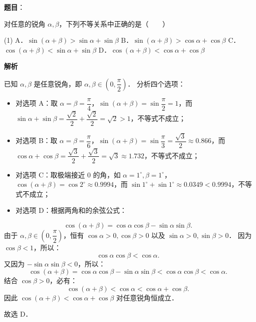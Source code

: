 \begin{answer}

\textbf{题目}：

对任意的锐角 $\alpha, \beta$，下列不等关系中正确的是\mbox{（　　）}

\begin{gkopts}(1)
\task A．$\sin(\alpha + \beta) > \sin\alpha + \sin\beta$
\task B．$\sin(\alpha + \beta) > \cos\alpha + \cos\beta$
\task C．$\cos(\alpha + \beta) < \sin\alpha + \sin\beta$
\task D．$\cos(\alpha + \beta) < \cos\alpha + \cos\beta$
\end{gkopts}

\textbf{解析}

已知 $\alpha, \beta$ 是任意锐角，即 $\alpha, \beta \in \left(0, \dfrac{\pi}{2}\right)$．
分析四个选项：
\begin{itemize}
\item 对选项 A：取 $\alpha = \beta = \dfrac{\pi}{4}$，$\sin(\alpha + \beta) = \sin\dfrac{\pi}{2} = 1$，而 $\sin\alpha + \sin\beta = \dfrac{\sqrt{2}}{2} + \dfrac{\sqrt{2}}{2} = \sqrt{2} > 1$，不等式不成立；
\item 对选项 B：取 $\alpha = \beta = \dfrac{\pi}{6}$，$\sin(\alpha + \beta) = \sin\dfrac{\pi}{3} = \dfrac{\sqrt{3}}{2} \approx 0.866$，而 $\cos\alpha + \cos\beta = \dfrac{\sqrt{3}}{2} + \dfrac{\sqrt{3}}{2} = \sqrt{3} \approx 1.732$，不等式不成立；
\item 对选项 C：取极端接近 0 的角，如 $\alpha = 1^\circ, \beta = 1^\circ$，$\cos(\alpha + \beta) = \cos 2^\circ \approx 0.9994$，而 $\sin 1^\circ + \sin 1^\circ \approx 0.0349 < 0.9994$，不等式不成立；
\item 对选项 D：根据两角和的余弦公式：
\end{itemize}
\nopagebreak[4]
\[
\cos(\alpha + \beta) = \cos\alpha \cos\beta - \sin\alpha \sin\beta.
\]
  由于 $\alpha, \beta \in \left(0, \dfrac{\pi}{2}\right)$，恒有 $\cos\alpha > 0, \cos\beta > 0$ 以及 $\sin\alpha > 0, \sin\beta > 0$．
  因为 $\cos\beta < 1$，所以：
\nopagebreak[4]
\[
\cos\alpha \cos\beta < \cos\alpha.
\]
  又因为 $-\sin\alpha \sin\beta < 0$，所以：
\nopagebreak[4]
\[
\cos(\alpha + \beta) = \cos\alpha \cos\beta - \sin\alpha \sin\beta < \cos\alpha \cos\beta < \cos\alpha.
\]
  结合 $\cos\beta > 0$，必有：
\nopagebreak[4]
\[
\cos(\alpha + \beta) < \cos\alpha < \cos\alpha + \cos\beta.
\]
  因此 $\cos(\alpha + \beta) < \cos\alpha + \cos\beta$ 对任意锐角恒成立．

故选 D．


\end{answer}
